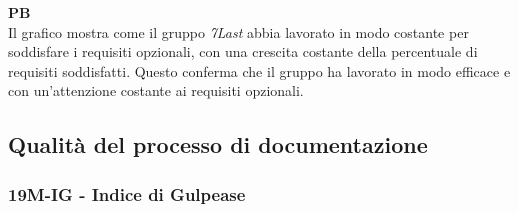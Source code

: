 \textbf{PB} \\
Il grafico mostra come il gruppo \textit{7Last} abbia lavorato in modo costante per soddisfare i requisiti opzionali, con una crescita costante della percentuale di requisiti soddisfatti. Questo conferma che il gruppo ha lavorato in modo efficace e con un'attenzione costante ai requisiti opzionali.



\newpage
\subsection{Qualità del processo di documentazione}
\subsubsection{19M-IG - Indice di Gulpease}
